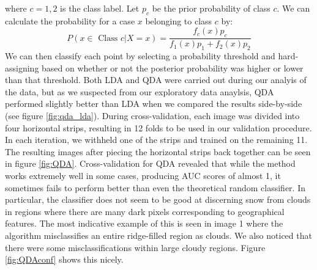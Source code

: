 \documentclass{article}\usepackage[]{graphicx}\usepackage[]{color}
\begin{document}
where $c=1,2$ is the class label.  Let $p_c$ be the prior probability of class $c$.  We can calculate the probability for a case $x$ belonging to class $c$ by:
\begin{equation}
P(x \in \textrm{ Class } c \vert X=x) = \frac{f_c(x) p_c}{f_1(x) p_1 + f_2(x) p_2}
\end{equation}
We can then classify each point by selecting a probability threshold and hard-assigning based on whether or not the posterior probability was higher or lower than that threshold.  Both LDA and QDA were carried out during our analyis of the data, but as we suspected from our exploratory data anaylsis, QDA performed slightly better than LDA when we compared the results side-by-side (see figure \ref{fig:qda_lda}).
During cross-validation, each image was divided into four horizontal strips, resulting in 12 folds to be used in our validation procedure.  In each iteration, we withheld one of the strips and trained on the remaining 11.  The resulting images after piecing the horizontal strips back together can be seen in figure \ref{fig:QDA}.
Cross-validation for QDA revealed that while the method works extremely well in some cases, producing AUC scores of almost 1, it sometimes fails to perform better than even the theoretical random classifier.  In particular, the classifier does not seem to be good at discerning snow from clouds in regions where there are many dark pixels corresponding to geographical features.  The most indicative example of this is seen in image 1 where the algorithm misclassifies an entire ridge-filled region as clouds.  We also noticed that there were some misclassifications within large cloudy regions.  Figure \ref{fig:QDAconf} shows this nicely.
\end{document}
